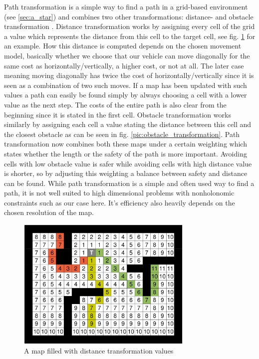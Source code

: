 Path transformation is a simple way to find a path in a grid-based environment (see \ref{sec:a_star}) and combines two other transformations: distance- and obstacle transformation \cite{35}. Distance transformation works by assigning every cell of the grid a value which represents the distance from this cell to the target cell, see fig. \ref{pic:distance_transformation} for an example. How this distance is computed depends on the chosen movement model, basically whether we choose that our vehicle can move diagonally for the same cost as horizontally/vertically, a higher cost, or not at all. The later case meaning moving diagonally has twice the cost of horizontally/vertically since it is seen as a combination of two such moves. If a map has been updated with such values a path can easily be found simply by always choosing a cell with a lower value as the next step. The costs of the entire path is also clear from the beginning since it is stated in the first cell. Obstacle transformation works similarly by assigning each cell a value stating the distance between this cell and the closest obstacle as can be seen in fig. \ref{pic:obstacle_transformation}. Path transformation now combines both these maps under a certain weighting which states whether the length or the safety of the path is more important. Avoiding cells with low obstacle value is safer while avoiding cells with high distance value is shorter, so by adjusting this weighting a balance between safety and distance can be found. 
While path transformation is a simple and often used way to find a path, it is not well suited to high dimensional problems with nonholonomic constraints such as our case here. It's efficiency also heavily depends on the chosen resolution of the map.

\begin{figure}[b]
\centering
\includegraphics[width=0.75\textwidth]{./Chapters/Figures/distance_transformation.png}
\caption{A map filled with distance transformation values\label{pic:distance_transformation}}
\end{figure}

